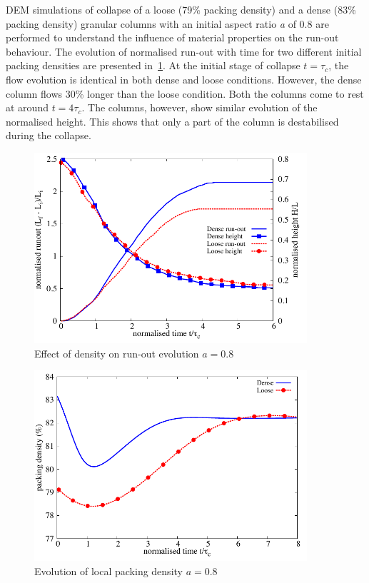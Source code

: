 DEM simulations of collapse of a loose (79\% packing density) and a dense (83\% 
packing density) granular columns with an initial aspect ratio \textit{a} of 
0.8 are performed to understand the influence of material properties on the 
run-out behaviour. The evolution of normalised run-out with time for two 
different initial packing densities are presented 
in~\cref{fig:runout_height_dense_r18}. At the initial 
stage of collapse $t=\tau_c$, the flow evolution is identical in both dense and 
loose conditions. However, the dense column flows 30\% longer than the loose 
condition. Both the columns come to rest at around $t = 4\tau_c$. The columns, 
however, show similar evolution of the normalised height. This shows that only 
a part of the column is destabilised during the collapse.
\begin{figure}[h]
\centering
\includegraphics[width=0.9\textwidth]{runout_height_dense_r18}
\caption{Effect of density on run-out evolution $a = 0.8$}
\label{fig:runout_height_dense_r18}
\end{figure}

\begin{figure}[h]
\centering
\includegraphics[width=0.9\textwidth]{voro_r18}
\caption{Evolution of local packing density $a = 0.8$}
\label{fig:voro_r18}
\end{figure}


